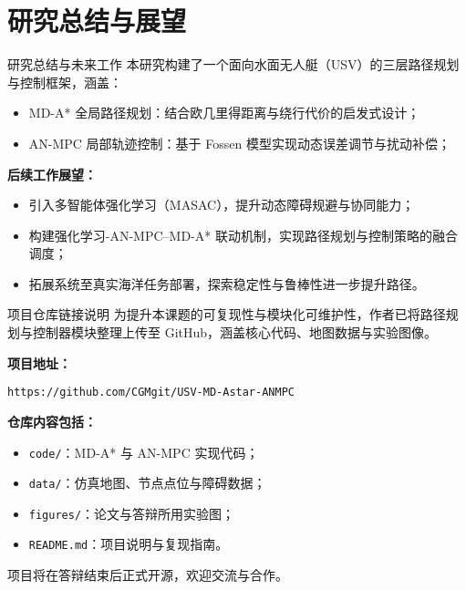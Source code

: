 \section{研究总结与展望}

\begin{frame}{研究总结与未来工作}
\justifying
本研究构建了一个面向水面无人艇（USV）的三层路径规划与控制框架，涵盖：

\begin{itemize}
    \item MD-A* 全局路径规划：结合欧几里得距离与绕行代价的启发式设计；
    \item AN-MPC 局部轨迹控制：基于 Fossen 模型实现动态误差调节与扰动补偿；
\end{itemize}

\vspace{0.5em}
\textbf{后续工作展望：}
\begin{itemize}
    \item 引入多智能体强化学习（MASAC），提升动态障碍规避与协同能力；
    \item 构建强化学习-AN-MPC–MD-A* 联动机制，实现路径规划与控制策略的融合调度；
    \item 拓展系统至真实海洋任务部署，探索稳定性与鲁棒性进一步提升路径。
\end{itemize}
\end{frame}

\begin{frame}{项目仓库链接说明}
\justifying
为提升本课题的可复现性与模块化可维护性，作者已将路径规划与控制器模块整理上传至 GitHub，涵盖核心代码、地图数据与实验图像。

\vspace{0.8em}
\textbf{项目地址：}
\begin{center}
\texttt{https://github.com/CGMgit/USV-MD-Astar-ANMPC}
\end{center}

\vspace{0.5em}
\textbf{仓库内容包括：}
\begin{itemize}
    \item \texttt{code/}：MD-A* 与 AN-MPC 实现代码；
    \item \texttt{data/}：仿真地图、节点点位与障碍数据；
    \item \texttt{figures/}：论文与答辩所用实验图；
    \item \texttt{README.md}：项目说明与复现指南。
\end{itemize}

\vspace{0.5em}
项目将在答辩结束后正式开源，欢迎交流与合作。
\end{frame}
